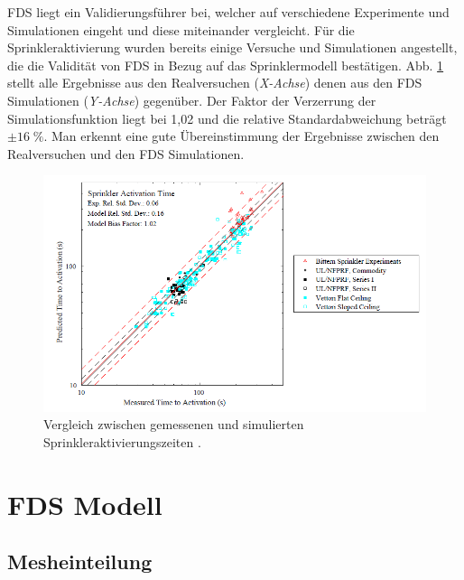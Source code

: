 FDS liegt ein Validierungsführer bei, welcher auf verschiedene Experimente und Simulationen eingeht und diese miteinander vergleicht. Für die Sprinkleraktivierung wurden bereits einige Versuche und Simulationen angestellt, die die Validität von FDS in Bezug auf das Sprinklermodell bestätigen. Abb. \ref{fig:SprinklerVal} stellt alle Ergebnisse aus den Realversuchen (\emph{X-Achse}) denen aus den FDS Simulationen (\emph{Y-Achse}) gegenüber. Der Faktor der Verzerrung der Simulationsfunktion liegt bei 1,02 und die relative Standardabweichung beträgt $\pm 16\; \%$. Man erkennt eine gute Übereinstimmung der Ergebnisse zwischen den Realversuchen und den FDS Simulationen.
\begin{figure}
    \centering
    \includegraphics[width=.9\textwidth]{images/SprinklerValidation.PNG}
    \caption{Vergleich zwischen gemessenen und simulierten Sprinkleraktivierungszeiten  \cite{FDSVal}.}
    \label{fig:SprinklerVal}
\end{figure}



\section{FDS Modell}
\label{sec:FDSModell}
 
\subsection{Mesheinteilung}
\label{sec:endgueltigeMesheinteilung}

